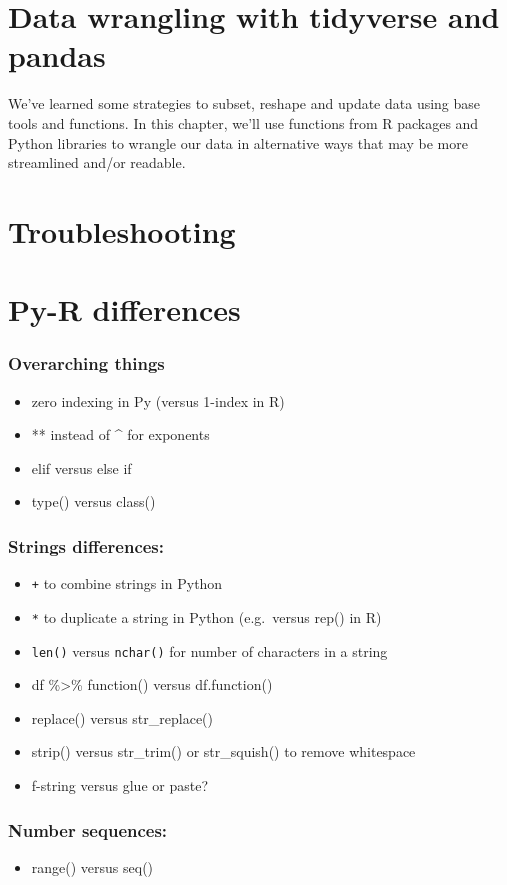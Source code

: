 \documentclass[
]{book}
\providecommand{\tightlist}{%
  \setlength{\itemsep}{0pt}\setlength{\parskip}{0pt}}
\begin{document}
\hypertarget{wrangling}{%
\chapter{Data wrangling with tidyverse and pandas}\label{wrangling}}

We've learned some strategies to subset, reshape and update data using base tools and functions. In this chapter, we'll use functions from R packages and Python libraries to wrangle our data in alternative ways that may be more streamlined and/or readable.

\hypertarget{troubleshooting}{%
\chapter{Troubleshooting}\label{troubleshooting}}

\hypertarget{py-r}{%
\chapter{Py-R differences}\label{py-r}}

\hypertarget{overarching-things}{%
\subsection{Overarching things}\label{overarching-things}}

\begin{itemize}
\tightlist
\item
  zero indexing in Py (versus 1-index in R)
\item
  ** instead of \^{} for exponents
\item
  elif versus else if
\item
  type() versus class()
\end{itemize}

\hypertarget{strings-differences}{%
\subsection{Strings differences:}\label{strings-differences}}

\begin{itemize}
\tightlist
\item
  \texttt{+} to combine strings in Python
\item
  \texttt{*} to duplicate a string in Python (e.g.~versus rep() in R)
\item
  \texttt{len()} versus \texttt{nchar()} for number of characters in a string
\item
  df \%\textgreater\% function() versus df.function()
\item
  replace() versus str\_replace()
\item
  strip() versus str\_trim() or str\_squish() to remove whitespace
\item
  f-string versus glue or paste?
\end{itemize}

\hypertarget{number-sequences}{%
\subsection{Number sequences:}\label{number-sequences}}

\begin{itemize}
\tightlist
\item
  range() versus seq()
\end{itemize}

  
\end{document}
